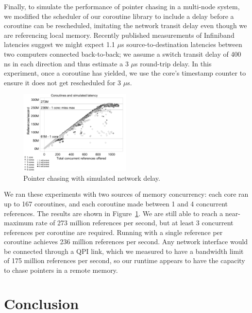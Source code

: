 \documentclass{acm_proc_article-sp}
\begin{document}
Finally, to simulate the performance of pointer chasing in a
multi-node system, we modified the scheduler of our coroutine library
to include a delay before a coroutine can be rescheduled, imitating
the network transit delay even though we are referencing local
memory. Recently published measurements of Infiniband latencies
 suggest we might expect 1.1 $\mu$s source-to-destination
latencies between two computers connected back-to-back; we assume a
switch transit delay of 400 ns in each direction and thus estimate a 3
$\mu$s round-trip delay. In this experiment, once a coroutine has
yielded, we use the core's timestamp counter to ensure it does not get
rescheduled for 3 $\mu$s.

\begin{figure}[h]
  \begin{center}
    \includegraphics[width=0.5\textwidth]{figures/multi-green-delay7800-edited.pdf}
  \end{center}
  \caption{Pointer chasing with simulated network delay.}
  \label{fig:network-delay}
\end{figure}

We ran these experiments with two sources of memory concurrency: each
core ran up to 167 coroutines, and each coroutine made between 1 and 4
concurrent references. The results are shown in
Figure~\ref{fig:network-delay}. We are still able to reach a
near-maximum rate of 273 million references per second, but at least 3
concurrent references per coroutine are required. Running with a single
reference per coroutine achieves 236 million references per
second. Any network interface would be connected through a QPI link,
which we measured to have a bandwidth limit of 175 million references
per second, so our runtime appears to have the capacity to chase pointers
in a remote memory. 



%


\section{Conclusion}
\label{sec:conclusion}






\end{document}

